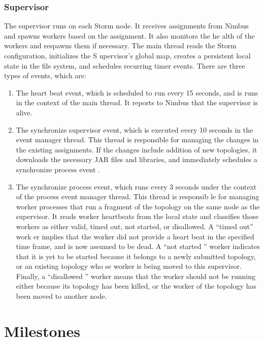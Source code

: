 \documentclass[9pt,twocolumn,twoside]{../../styles/osajnl}
\begin{document}
\subsubsection{Supervisor}


The supervisor runs on each Storm node. It receives assignments from
Nimbus and spawns workers based on the assignment. It also monitors
the he alth of the workers and respawns them if necessary. The main
thread reads the Storm configuration, initializes the S upervisor’s
global map, creates a persistent local state in the file system, and
schedules recurring timer events. There are three types of events,
which are:

\begin{enumerate}
\item The heart beat event, which is scheduled to run every 15
  seconds, and is runs in the context of the main thread. It reports
  to Nimbus that the supervisor is alive.
\item The synchronize supervisor event, which is executed every 10
  seconds in the event manager thread. This thread is responsible for
  managing the changes in the existing assignments. If the changes
  include addition of new topologies, it downloads the necessary JAR
  files and libraries, and immediately schedules a synchronize process
  event .
\item The synchronize process event, which runs every 3 seconds under
  the context of the process event manager thread. This thread is
  responsib le for managing worker processes that run a fragment of
  the topology on the same node as the supervisor. It reads worker
  heartbeats from the local state and classifies those workers as
  either valid, timed out, not started, or disallowed. A “timed out”
  work er implies that the worker did not provide a heart beat in the
  specified time frame, and is now assumed to be dead. A “not started
  ” worker indicates that it is yet to be started because it belongs
  to a newly submitted topology, or an existing topology who se worker
  is being moved to this supervisor. Finally, a “disallowed ” worker
  means that the worker should not be running either because its
  topology has been killed, or the worker of the topology has been
  moved to another node.
\end{enumerate}



\section{Milestones}
\end{document}
